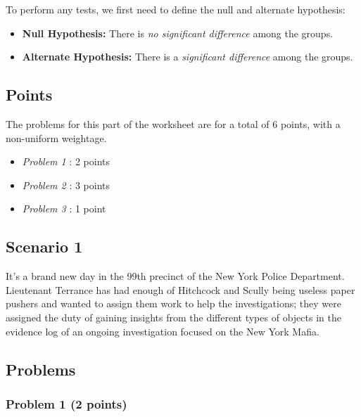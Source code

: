 \documentclass[
]{article}
\providecommand{\tightlist}{%
  \setlength{\itemsep}{0pt}\setlength{\parskip}{0pt}}
\begin{document}
To perform any tests, we first need to define the null and alternate
hypothesis:

\begin{itemize}
\tightlist
\item
  \textbf{Null Hypothesis:} There is \emph{no significant difference}
  among the groups.
\item
  \textbf{Alternate Hypothesis:} There is a \emph{significant
  difference} among the groups.
\end{itemize}

\hypertarget{points-1}{%
\subsection{Points}\label{points-1}}

The problems for this part of the worksheet are for a total of 6 points,
with a non-uniform weightage.

\begin{itemize}
\tightlist
\item
  \emph{Problem 1} : 2 points
\item
  \emph{Problem 2} : 3 points
\item
  \emph{Problem 3} : 1 point
\end{itemize}

\hypertarget{scenario-1}{%
\subsection{Scenario 1}\label{scenario-1}}

It's a brand new day in the 99th precinct of the New York Police
Department. Lieutenant Terrance has had enough of Hitchcock and Scully
being useless paper pushers and wanted to assign them work to help the
investigations; they were assigned the duty of gaining insights from the
different types of objects in the evidence log of an ongoing
investigation focused on the New York Mafia.

\hypertarget{problems-1}{%
\subsection{Problems}\label{problems-1}}

\hypertarget{problem-1-2-points}{%
\subsubsection{Problem 1 (2 points)}\label{problem-1-2-points}}
\end{document}
